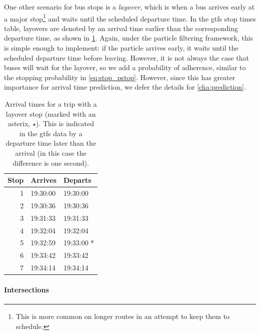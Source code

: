 One other scenario for bus stops is a \emph{layover}, which is when a bus arrives early at a major stop\footnote{This is more common on longer routes in an attempt to keep them to schedule.} and waits until the scheduled departure time. In the \gls{gtfs} stop times table, layovers are denoted by an arrival time earlier than the corresponding departure time, as shown in \cref{tab:layover_times}. Again, under the particle filtering framework, this is simple enough to implement: if the particle arrives early, it waits until the scheduled departure time before leaving. However, it is not always the case that buses will wait for the layover, so we add a probability of adherence, similar to the stopping probability in \cref{eq:stop_pstop}. However, since this has greater importance for arrival time prediction, we defer the details for \cref{cha:prediction}.

\begin{knitrout}\small
{}\color{fgcolor}\begin{table}

\caption[Arrival times for a trip with a layover]{\label{tab:layover_times}Arrival times for a trip with a layover stop (marked with an asterix, $\star$). This is indicated in the \gls{gtfs} data by a departure time later than the arrival (in this case the difference is one second).}
\centering
\fontsize{8}{10}\selectfont
\begin{tabular}[t]{rll}
\toprule
Stop & Arrives & Departs\\
\midrule
1 & 19:30:00 & 19:30:00\\
2 & 19:30:36 & 19:30:36\\
3 & 19:31:33 & 19:31:33\\
4 & 19:32:04 & 19:32:04\\
5 & 19:32:59 & 19:33:00 *\\
6 & 19:33:42 & 19:33:42\\
7 & 19:34:14 & 19:34:14\\
\bottomrule
\end{tabular}
\end{table}


\end{knitrout}




\paragraph{Intersections}


